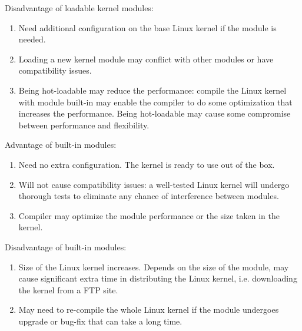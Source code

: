 \documentclass[11pt,letterpaper,titlepage]{article}
\begin{document}
Disadvantage of loadable kernel modules:

\begin{enumerate}
    
    \item Need additional configuration on the base Linux kernel if the module is needed.
    
    \item Loading a new kernel module may conflict with other modules or have compatibility issues.
    
    \item Being hot-loadable may reduce the performance: compile the Linux kernel with module built-in may enable the compiler to do some optimization that increases the performance. Being hot-loadable may cause some compromise between performance and flexibility.
    
\end{enumerate}

Advantage of built-in modules:

\begin{enumerate}
    
    \item Need no extra configuration. The kernel is ready to use out of the box.
    
    \item Will not cause compatibility issues: a well-tested Linux kernel will undergo thorough tests to eliminate any chance of interference between modules.
    
    \item Compiler may optimize the module performance or the size taken in the kernel.
    
\end{enumerate}

Disadvantage of built-in modules:

\begin{enumerate}
    
    \item Size of the Linux kernel increases. Depends on the size of the module, may cause significant extra time in distributing the Linux kernel, i.e. downloading the kernel from a FTP site.
    
    \item May need to re-compile the whole Linux kernel if the module undergoes upgrade or bug-fix that can take a long time.
    
\end{enumerate}
\end{document}
